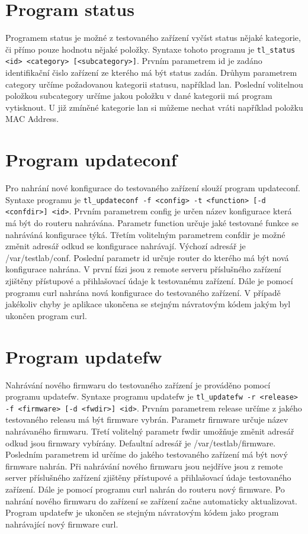 \section{Program status}
Programem status je možné z testovaného zařízení vyčíst status nějaké kategorie, či přímo pouze hodnotu nějaké položky. Syntaxe tohoto programu je \texttt{tl\_status <id> <category> [<subcategory>]}. Prvním parametrem id je zadáno identifikační čislo zařízení ze kterého má být status zadán. Drůhym parametrem category určíme požadovanou kategorii statusu, například lan. Poslední volitelnou položkou subcategory určíme jakou položku v dané kategorii má program vytisknout. U již zmíněné kategorie lan si můžeme nechat vráti například položku MAC Address.

\section{Program updateconf}
Pro nahrání nové konfigurace do testovaného zařízení slouží program updateconf. Syntaxe programu je \texttt{tl\_updateconf -f <config> -t <function> [-d <confdir>] <id>}. Prvním parametrem config je určen název konfigurace která má být do routeru nahrávána. Parametr function určuje jaké testované funkce se nahráváná konfigurace týká. Třetím volitelným parametrem confdir je možné změnit adresář odkud se konfigurace nahrávají. Výchozí adresář je /var/testlab/conf. Poslední parametr id určuje router do kterého má být nová konfigurace nahrána. V první fázi jsou z remote serveru příslušného zařízení zjištěny přístupové a přihlašovací údaje k testovanému zařízení. Dále je pomocí programu curl nahrána nová konfigurace do testovaného zařízení. V případě jakékoliv chyby je aplikace ukončena se stejným návratovým kódem jakým byl ukončen program curl.

\section{Program updatefw}
Nahrávání nového firmwaru do testovaného zařízení je prováděno pomocí programu updatefw. Syntaxe programu updatefw je \texttt{tl\_updatefw -r <release> -f <firmware> [-d <fwdir>] <id>}. Prvním parametrem release určíme z jakého testovaného releasu má být firmware vybrán. Parametr firmware určuje název nahrávaného firmwaru. Třetí volitelný parametr fwdir umožňuje změnit adresář odkud jsou firmwary vybírány. Defaultní adresář je /var/testlab/firmware. Posledním parametrem id určíme do jakého testovaného zařízení má být nový firmware nahrán. Při nahrávání nového firmwaru jsou nejdříve jsou z remote server příslušného zařízení zjištěny přístupové a přihlašovací údaje testovaného zařízení. Dále je pomocí programu curl nahrán do routeru nový firmware. Po nahrání nového firmwaru do zařízení se zařízení začne automaticky aktualizovat. Program updatefw je ukončen se stejným návratovým kódem jako program nahrávající nový firmware curl. 

